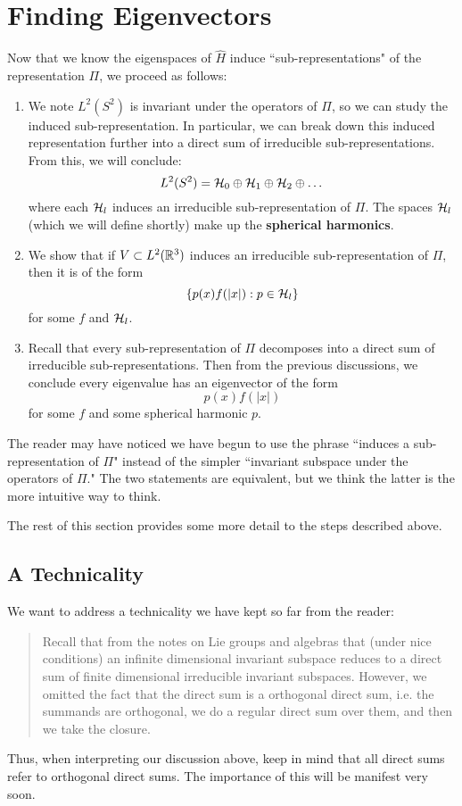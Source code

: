 \section{Finding Eigenvectors}
Now that we know the eigenspaces of $\hat{H}$ induce ``sub-representations" of the representation $\Pi$, we proceed as follows:
\begin{enumerate}
    \item We note $L^2(S^2)$ is invariant under the operators of $\Pi$, so we can study the induced sub-representation. In particular, we can break down this induced representation further into a direct sum of irreducible sub-representations. From this, we will conclude:
        \[
            L^2(S^2) = {\mathcal H}_0 \oplus {\mathcal H}_1 \oplus {\mathcal H}_2 \oplus \dots
        \]
        where each ${\mathcal H}_l$ induces an irreducible sub-representation of $\Pi$. The spaces ${\mathcal H}_l$ (which we will define shortly) make up the \textbf{spherical harmonics}.

    \item We show that if $V \subset L^2({\mathbb R}^3)$ induces an irreducible sub-representation of $\Pi$, then it is of the form
        \[
            \{p(x)f(|x|): p \in {\mathcal H}_l\}
        \]
        for some $f$ and ${\mathcal H}_l$.

    \item Recall that every sub-representation of $\Pi$ decomposes into a direct sum of irreducible sub-representations. Then from the previous discussions, we conclude every eigenvalue has an eigenvector of the form
        \[
            p(x)f(|x|)
        \]
        for some $f$ and some spherical harmonic $p$.
\end{enumerate}
The reader may have noticed we have begun to use the phrase ``induces a sub-representation of $\Pi$" instead of the simpler ``invariant subspace under the operators of $\Pi$." The two statements are equivalent, but we think the latter is the more intuitive way to think.

The rest of this section provides some more detail to the steps described above.

\subsection{A Technicality}
We want to address a technicality we have kept so far from the reader:
\begin{quote}
    Recall that from the notes on Lie groups and algebras that (under nice conditions) an infinite dimensional invariant subspace reduces to a direct sum of finite dimensional irreducible invariant subspaces. However, we omitted the fact that the direct sum is a orthogonal direct sum, i.e. the summands are orthogonal, we do a regular direct sum over them, and then we take the closure.
\end{quote}
Thus, when interpreting our discussion above, keep in mind that all direct sums refer to orthogonal direct sums. The importance of this will be manifest very soon.

